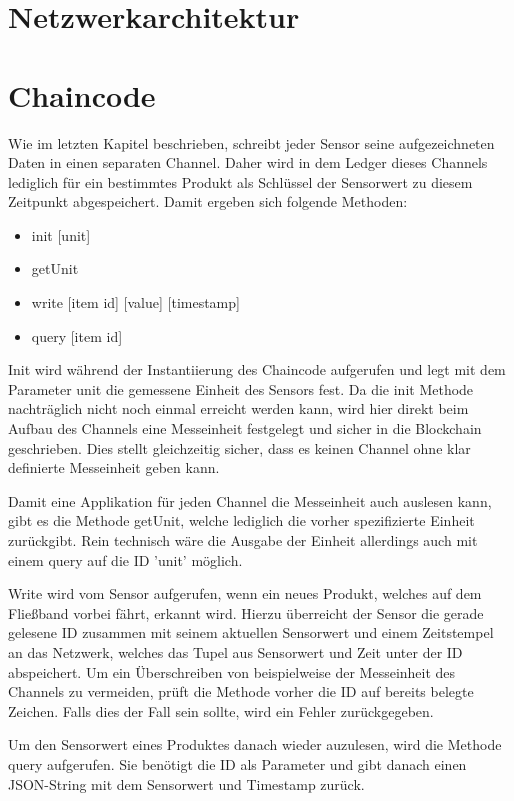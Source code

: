 \documentclass[12pt]{report}
\begin{document}
\chapter{Netzwerkarchitektur}

\chapter{Chaincode} %
Wie im letzten Kapitel beschrieben, schreibt jeder Sensor seine aufgezeichneten Daten in einen separaten Channel. Daher wird in dem Ledger dieses Channels lediglich für ein bestimmtes Produkt als Schlüssel der Sensorwert zu diesem Zeitpunkt abgespeichert. Damit ergeben sich folgende Methoden:
\begin{itemize}
    \item init [unit]
    \item getUnit
    \item write [item id] [value] [timestamp]
    \item query [item id]
\end{itemize}{}

Init wird während der Instantiierung des Chaincode aufgerufen und legt mit dem Parameter unit die gemessene Einheit des Sensors fest. Da die init Methode nachträglich nicht noch einmal erreicht werden kann, wird hier direkt beim Aufbau des Channels eine Messeinheit festgelegt und sicher in die Blockchain geschrieben. Dies stellt gleichzeitig sicher, dass es keinen Channel ohne klar definierte Messeinheit geben kann.

Damit eine Applikation für jeden Channel die Messeinheit auch auslesen kann, gibt es die Methode getUnit, welche lediglich die vorher spezifizierte Einheit zurückgibt. Rein technisch wäre die Ausgabe der Einheit allerdings auch mit einem query auf die ID 'unit' möglich.

Write wird vom Sensor aufgerufen, wenn ein neues Produkt, welches auf dem Fließband vorbei fährt, erkannt wird. Hierzu überreicht der Sensor die gerade gelesene ID zusammen mit seinem aktuellen Sensorwert und einem Zeitstempel an das Netzwerk, welches das Tupel aus Sensorwert und Zeit unter der ID abspeichert. Um ein Überschreiben von beispielweise der Messeinheit des Channels zu vermeiden, prüft die Methode vorher die ID auf bereits belegte Zeichen. Falls dies der Fall sein sollte, wird ein Fehler zurückgegeben.

Um den Sensorwert eines Produktes danach wieder auzulesen, wird die Methode query aufgerufen. Sie benötigt die ID als Parameter und gibt danach einen JSON-String mit dem Sensorwert und Timestamp zurück.
\end{document}
